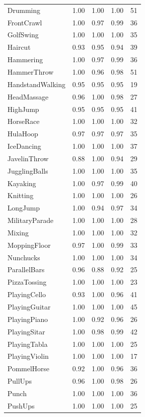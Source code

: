 \documentclass[../main.tex]{subfiles}
\begin{document}
\begin{longtable}{lcccc}
Drumming & 1.00 & 1.00 & 1.00 & 51 \\
FrontCrawl & 1.00 & 0.97 & 0.99 & 36 \\
GolfSwing & 1.00 & 1.00 & 1.00 & 35 \\
Haircut & 0.93 & 0.95 & 0.94 & 39 \\
Hammering & 1.00 & 0.97 & 0.99 & 36 \\
HammerThrow & 1.00 & 0.96 & 0.98 & 51 \\
HandstandWalking & 0.95 & 0.95 & 0.95 & 19 \\
HeadMassage & 0.96 & 1.00 & 0.98 & 27 \\
HighJump & 0.95 & 0.95 & 0.95 & 41 \\
HorseRace & 1.00 & 1.00 & 1.00 & 32 \\
HulaHoop & 0.97 & 0.97 & 0.97 & 35 \\
IceDancing & 1.00 & 1.00 & 1.00 & 37 \\
JavelinThrow & 0.88 & 1.00 & 0.94 & 29 \\
JugglingBalls & 1.00 & 1.00 & 1.00 & 35 \\
Kayaking & 1.00 & 0.97 & 0.99 & 40 \\
Knitting & 1.00 & 1.00 & 1.00 & 26 \\
LongJump & 1.00 & 0.94 & 0.97 & 34 \\
MilitaryParade & 1.00 & 1.00 & 1.00 & 28 \\
Mixing & 1.00 & 1.00 & 1.00 & 32 \\
MoppingFloor & 0.97 & 1.00 & 0.99 & 33 \\
Nunchucks & 1.00 & 1.00 & 1.00 & 34 \\
ParallelBars & 0.96 & 0.88 & 0.92 & 25 \\
PizzaTossing & 1.00 & 1.00 & 1.00 & 23 \\
PlayingCello & 0.93 & 1.00 & 0.96 & 41 \\
PlayingGuitar & 1.00 & 1.00 & 1.00 & 45 \\
PlayingPiano & 1.00 & 0.92 & 0.96 & 26 \\
PlayingSitar & 1.00 & 0.98 & 0.99 & 42 \\
PlayingTabla & 1.00 & 1.00 & 1.00 & 25 \\
PlayingViolin & 1.00 & 1.00 & 1.00 & 17 \\
PommelHorse & 0.92 & 1.00 & 0.96 & 36 \\
PullUps & 0.96 & 1.00 & 0.98 & 26 \\
Punch & 1.00 & 1.00 & 1.00 & 36 \\
PushUps & 1.00 & 1.00 & 1.00 & 25 \\

\end{longtable}
\end{document}
